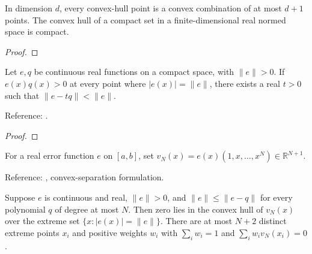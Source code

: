 \begin{supporting}
\begin{theorem}
\label{thm:compact-convex-hull}
\leanok
In dimension $d$, every convex-hull point is a convex combination of at most
$d+1$ points. The convex hull of a compact set in a finite-dimensional real
normed space is compact.
\end{theorem}
\begin{proof}
\leanok
\end{proof}

\begin{theorem}
\label{thm:uniform-extreme-improvement}
\leanok
Let $e,q$ be continuous real functions on a compact space, with $\|e\|>0$.
If $e(x)q(x)>0$ at every point where $|e(x)|=\|e\|$, there exists a real
$t>0$ such that $\|e-tq\|<\|e\|$.

Reference: \cite[Theorem 10.1]{atap}.
\end{theorem}
\begin{proof}
\leanok
\end{proof}

\begin{definition}
\label{def:extreme-moment}
\leanok
For a real error function $e$ on $[a,b]$, set
$v_N(x)=e(x)(1,x,\ldots,x^N)\in\mathbb R^{N+1}$.


Reference: \cite[Theorem 10.1]{atap}, convex-separation formulation.
\end{definition}


\begin{theorem}
\label{thm:extreme-moment-certificate}
\leanok
Suppose $e$ is continuous and real, $\|e\|>0$, and
$\|e\|\le\|e-q\|$ for every polynomial $q$ of degree at most $N$.
Then zero lies in the convex hull of $v_N(x)$ over the extreme set
$\{x:|e(x)|=\|e\|\}$. There are at most $N+2$ distinct extreme points
$x_i$ and positive weights $w_i$ with $\sum_iw_i=1$ and
$\sum_iw_i v_N(x_i)=0$.


\end{theorem}
\end{supporting}
